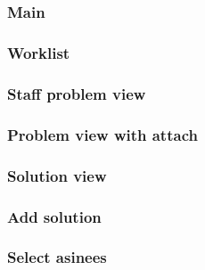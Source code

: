 
\subsection{\sinterface}

\subsubsection{Main}

\subsubsection{Worklist}

\subsubsection{Staff problem view}

\subsubsection{Problem view with attach}

\subsubsection{Solution view}

\subsubsection{Add solution}

\subsubsection{Select asinees}


